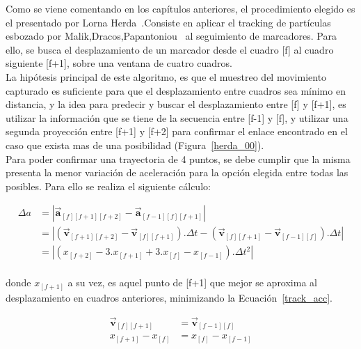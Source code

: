 Como se viene comentando en los capítulos anteriores, el procedimiento elegido es el presentado por Lorna Herda~\cite{herda}.Consiste en aplicar el tracking de partículas esbozado por Malik,Dracos,Papantoniou~\cite{griegos} al seguimiento de marcadores. Para ello, se busca el desplazamiento de un marcador desde el cuadro [f] al cuadro siguiente [f+1], sobre una ventana de cuatro cuadros.
\\ 

La hipótesis principal de este algoritmo, es que el muestreo del movimiento capturado es suficiente para que el desplazamiento entre cuadros sea mínimo en distancia, y la idea para predecir y buscar el desplazamiento entre [f] y [f+1], es utilizar la información que se tiene de la secuencia entre [f-1] y [f], y utilizar una segunda proyección entre [f+1] y [f+2] para confirmar el enlace encontrado en el caso que exista mas de una posibilidad (Figura~\ref{herda_00}).
\\ 

Para poder confirmar una trayectoria de 4 puntos, se debe cumplir que la misma presenta la menor variación de aceleración para la opción elegida entre todas las posibles. Para ello se realiza el siguiente cálculo:

\begin{equation}
\begin{split}
\Delta{a}&= \left| \boldsymbol{\overrightarrow{a}}_{[f][f+1][f+2]}-\boldsymbol{\overrightarrow{a}}_{[f-1][f][f+1]} \right| \\
&= \left| \left(\boldsymbol{\overrightarrow{v}}_{[f+1][f+2]}-\boldsymbol{\overrightarrow{v}}_{[f][f+1]}\right).\Delta{t}-\left(\boldsymbol{\overrightarrow{v}}_{[f][f+1]}-\boldsymbol{\overrightarrow{v}}_{[f-1][f]}\right).\Delta{t} \right| \\
&= \left|\left( x_{[f+2]} - 3.x_{[f+1]} + 3.x_{[f]} - x_{[f-1]} \right).\Delta{t}^2\right|\\
\end{split}
\label{track_var_acc}
\end{equation}

donde $x_{[f+1]}$ a su vez, es aquel punto de [f+1] que mejor se aproxima al desplazamiento en cuadros anteriores, minimizando la Ecuación~\ref{track_acc}. 

\begin{equation}
\begin{split}
\boldsymbol{\overrightarrow{v}}_{[f][f+1]}& = \boldsymbol{\overrightarrow{v}}_{[f-1][f]} \\
x_{[f+1]}-x_{[f]}& = x_{[f]}-x_{[f-1]} \\
\end{split}
\label{track_acc}
\end{equation}

